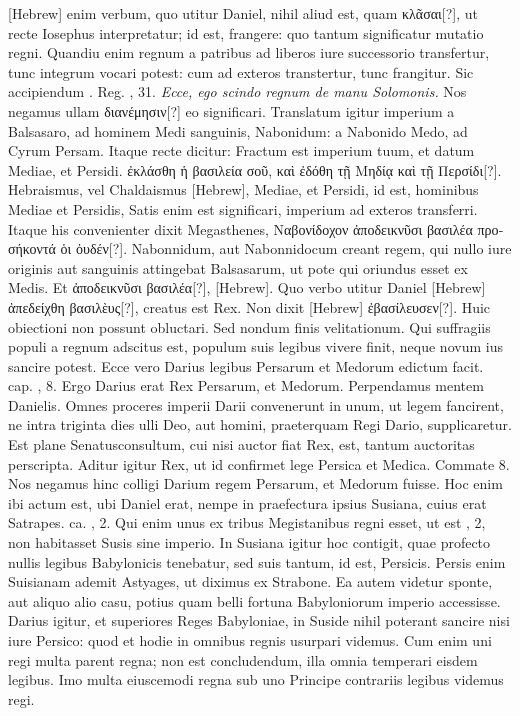 \texthebrew{[Hebrew]} enim verbum, quo utitur Daniel,
 nihil aliud est, quam
\textgreek{κλᾶσαι[?]}, ut recte Iosephus interpretatur;
 id est, frangere: quo tantum
significatur mutatio regni.
Quandiu enim regnum a patribus
ad liberos iure successorio transfertur, tunc integrum vocari potest:
cum ad exteros transtertur, tunc frangitur.
Sic accipiendum .
Reg. , 31.
\textit{Ecce, ego scindo regnum  de manu Solomonis.}
Nos negamus ullam \textgreek{διανέμησιν[?]} eo significari.
Translatum igitur imperium
a Balsasaro, ad hominem Medi sanguinis, Nabonidum: a Nabonido
Medo, ad Cyrum Persam.
Itaque recte dicitur: Fractum est
imperium tuum, et datum Mediae, et Persidi.
\textgreek{ἐκλάσθη ἡ βασιλεία
σοῦ, καὶ ἐδόθη τῇ Μηδίᾳ καὶ τῇ Περσίδι[?]}.
Hebraismus, vel Chaldaismus
\texthebrew{[Hebrew]}, Mediae, et Persidi, id est, hominibus Mediae et Persidis,
Satis enim est significari, imperium ad exteros transferri.
Itaque his convenienter
dixit Megasthenes, \textgreek{Ναβονίδοχον ἀποδεικνῦσι βασιλέα προσήκοντά
ὁι ὀυδέν[?]}.
Nabonnidum, aut Nabonnidocum creant regem, qui
nullo iure originis aut sanguinis attingebat Balsasarum, ut pote qui
oriundus esset ex Medis.
Et \textgreek{ἀποδεικνῦσι βασιλέα[?]}, \texthebrew{[Hebrew]}.
Quo verbo utitur
Daniel \texthebrew{[Hebrew]} \textgreek{ἀπεδείχθη βασιλὲυς[?]}, creatus est Rex.
Non dixit \texthebrew{[Hebrew]} \textgreek{ἐβασίλευσεν[?]}.
Huic obiectioni non possunt obluctari.
Sed nondum
finis velitationum.
Qui suffragiis populi a regnum adscitus est,
populum suis legibus vivere finit, neque novum ius sancire potest.
Ecce vero Darius legibus Persarum et Medorum edictum facit.
cap. , 8.
Ergo Darius erat Rex Persarum, et Medorum.
Perpendamus
mentem Danielis.
Omnes proceres imperii Darii convenerunt
in unum, ut legem fancirent, ne intra triginta dies ulli
Deo, aut homini, praeterquam Regi Dario, supplicaretur.
Est plane
Senatusconsultum, cui nisi auctor fiat Rex, est, tantum auctoritas
perscripta.
Aditur igitur Rex, ut id confirmet lege Persica et
Medica.
Commate 8.
Nos negamus hinc colligi Darium regem
Persarum, et Medorum fuisse.
Hoc enim ibi actum est, ubi Daniel
erat, nempe in praefectura ipsius Susiana, cuius erat Satrapes.
ca. , 2.
Qui enim unus ex tribus Megistanibus regni esset, ut est
, 2, non habitasset Susis sine imperio.
In Susiana igitur hoc contigit,
quae profecto nullis legibus Babylonicis tenebatur, sed suis
tantum, id est, Persicis.
Persis enim Suisianam ademit Astyages, ut
diximus ex Strabone.
Ea autem videtur sponte, aut aliquo alio casu,
potius quam belli fortuna Babyloniorum imperio accessisse.
Darius igitur, et superiores Reges Babyloniae, in Suside nihil poterant
sancire nisi iure Persico: quod et hodie in omnibus regnis usurpari
videmus.
Cum enim uni regi multa parent regna; non est concludendum,
illa omnia temperari eisdem legibus.
Imo multa eiuscemodi regna sub uno Principe contrariis
 legibus videmus regi.

